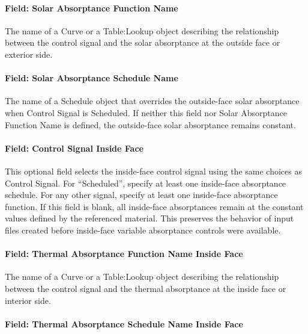 \paragraph{Field: Solar Absorptance Function Name}\label{field-solar-absorptance-function-name}

The name of a Curve or a Table:Lookup object describing the relationship between the control signal and the solar absorptance at the outside face or exterior side.

\paragraph{Field: Solar Absorptance Schedule Name}\label{field-solar-absorptance-schedule-name}

The name of a Schedule object that overrides the outside-face solar absorptance when Control Signal is Scheduled. If neither this field nor Solar Absorptance Function Name is defined, the outside-face solar absorptance remains constant.

\paragraph{Field: Control Signal Inside Face}\label{field-control-signal-inside-face}

This optional field selects the inside-face control signal using the same choices as Control Signal. For ``Scheduled'', specify at least one inside-face absorptance schedule. For any other signal, specify at least one inside-face absorptance function. If this field is blank, all inside-face absorptances remain at the constant values defined by the referenced material. This preserves the behavior of input files created before inside-face variable absorptance controls were available.

\paragraph{Field: Thermal Absorptance Function Name Inside Face}\label{field-thermal-absorptance-function-name-inside-face}

The name of a Curve or a Table:Lookup object describing the relationship between the control signal and the thermal absorptance at the inside face or interior side.

\paragraph{Field: Thermal Absorptance Schedule Name Inside Face}\label{field-thermal-absorptance-schedule-name-inside-face}

